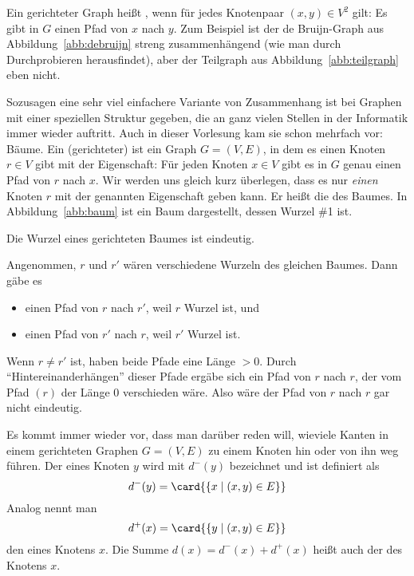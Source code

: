 Ein gerichteter Graph heißt , wenn für jedes Knotenpaar
$(x,y)\in V^2$ gilt: Es gibt in $G$ einen Pfad von $x$ nach $y$.
% 
Zum Beispiel ist der de Bruijn-Graph aus Abbildung~\ref{abb:debruijn}
streng zusammenhängend (wie man durch Durchprobieren herausfindet),
aber der Teilgraph aus Abbildung~\ref{abb:teilgraph} eben nicht.

Sozusagen eine sehr viel einfachere Variante von Zusammenhang ist bei
Graphen mit einer speziellen Struktur gegeben, die an ganz vielen
Stellen in der Informatik immer wieder auftritt.
% 
Auch in dieser Vorlesung kam sie schon mehrfach vor: Bäume.
% 
Ein (gerichteter)  ist ein Graph
$G=(V,E)$, in dem es einen Knoten $r\in V$ gibt mit der Eigenschaft:
Für jeden Knoten $x\in V$ gibt es in $G$ genau einen Pfad von $r$ nach
$x$.
% 
Wir werden uns gleich kurz überlegen, dass es nur \emph{einen} Knoten
$r$ mit der genannten Eigenschaft geben kann.
% 
Er heißt die  des Baumes.
% 
In Abbildung~\ref{abb:baum} ist ein Baum dargestellt, dessen Wurzel
\#{1} ist.

\begin{lemma} Die Wurzel eines gerichteten Baumes ist eindeutig.
\end{lemma}

\begin{beweis} Angenommen, $r$ und $r'$ wären verschiedene Wurzeln des
gleichen Baumes.
  Dann gäbe es
  \begin{itemize}
  \item einen Pfad von $r$ nach $r'$, weil $r$ Wurzel ist, und
  \item einen Pfad von $r'$ nach $r$, weil $r'$ Wurzel ist.
  \end{itemize} Wenn $r\not= r'$ ist, haben beide Pfade eine Länge
$>0$.
  Durch "`Hintereinanderhängen"' dieser Pfade ergäbe sich ein Pfad von
$r$ nach $r$, der vom Pfad $(r)$ der Länge $0$ verschieden wäre.
  Also wäre der Pfad von $r$ nach $r$ gar nicht eindeutig.
\end{beweis}

Es kommt immer wieder vor, dass man darüber reden will, wieviele
Kanten in einem gerichteten Graphen $G=(V,E)$ zu einem Knoten hin oder
von ihn weg führen.
% 
Der  eines Knoten $y$ wird
mit $d^{-}(y)$ bezeichnet und ist definiert als
\[ d^{-}(y) = \card{\{x \mid (x,y)\in E\}}
\] Analog nennt man
\[ d^{+}(x) = \card{\{y \mid (x,y)\in E\}}
\] den  eines Knotens $x$.
% 
Die Summe $d(x) =d^{-}(x) + d^{+}(x)$ heißt auch der
 des Knotens $x$.

